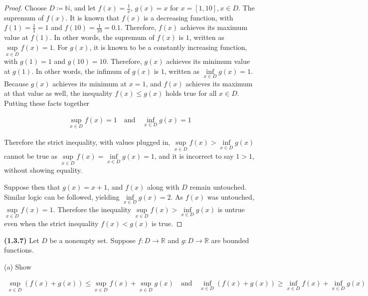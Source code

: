 \documentclass[12pt]{article}
\newcommand{\bR}{{\mathbb{R}}}
\newcommand{\bN}{{\mathbb{N}}}
\begin{document}
\begin{proof}
	Choose $D\coloneq\bN$, and let $f(x)=\frac{1}{x}$, $g(x)=x$ for $x=[1,10], x\in D$. The supremum of $f(x)$. It is known that $f(x)$ is a decreasing function, with $f(1)=\frac{1}{1}=1$ and $f(10)=\frac{1}{10}=0.1$. Therefore, $f(x)$ achieves its maximum value at $f(1)$. In other words, the supremum of $f(x)$ is $1$, written as $\underset{x\in D}{\sup} f(x)=1$. For $g(x)$, it is known to be a constantly increasing function, with $g(1)=1$ and $g(10)=10$. Therefore, $g(x)$ achieves its minimum value at $g(1)$. In other words, the infimum of $g(x)$ is $1$, written as $\underset{x\in D}{\inf} g(x) = 1$. Because $g(x)$ achieves its minimum at $x=1$, and $f(x)$ achieves its maximum at that value as well, the inequality $f(x) \le g(x)$ holds true for all $x\in D$. Putting these facts together
	
\begin{align*}
	\underset{x\in D}{\sup} f(x) = 1 \quad \text{and} \quad \underset{x\in D}{\inf} g(x) = 1
\end{align*}

\noindent Therefore the strict inequality, with values plugged in, $\underset{x\in D}{\sup} f(x) > \underset{x\in D}{\inf} g(x)$ cannot be true as $\underset{x\in D}{\sup} f(x)=\underset{x\in D}{\inf} g(x)=1$, and it is incorrect to say $1>1$, without showing equality.

Suppose then that $g(x)=x+1$, and $f(x)$ along with $D$ remain untouched. Similar logic can be followed, yielding $\underset{x\in D}{\inf} g(x) = 2$. As $f(x)$ was untouched, $\underset{x\in D}{\sup} f(x) = 1$. Therefore the inequality $\underset{x\in D}{\sup} f(x) > \underset{x\in D}{\inf} g(x)$ is untrue even when the strict inequality $f(x) < g(x)$ is true.

\end{proof}

\newpage

\noindent \textbf{(1.3.7)} Let $D$ be a nonempty set. Suppose $f : D\to\bR$ and $g : D\to \bR$ are bounded functions. \newline

\noindent (a) Show

\begin{align*}
	\underset{x\in D}{\sup}(f(x) + g(x))\le\underset{x\in D}{\sup}f(x) + \underset{x\in D}{\sup}g(x) \quad \text{and} \quad \underset{x\in D}{\inf}(f(x)+g(x))\ge \underset{x\in D}{\inf}f(x) + \underset{x\in D}{\inf}g(x)
\end{align*}
\end{document}
